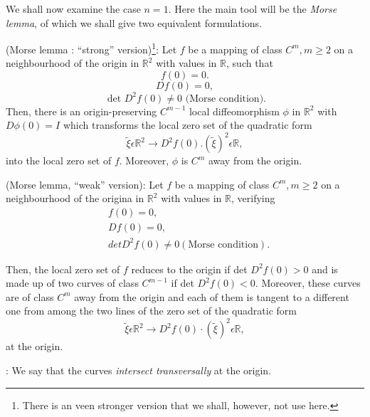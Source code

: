 We shall now examine the case $n = 1$. Here the main tool will be the {\em Morse lemma}, of which we shall give two equivalent formulations.

\begin{theorem}\label{chap1-thm3.1}
(Morse lemma : ``strong'' version)\footnote{There is an veen stronger version that we shall, however, not use here.}: Let $f$ be a mapping of class $C^{m}, m \geq 2$ on a neighbourhood of the origin in $\mathbb{R}^{2}$ with values in $\mathbb{R}$, such that
$$
f(0) = 0.
$$
$$
Df(0) = 0,
$$\pageoriginale
$$
\text{ det } D^{2}f(0) \neq 0 \text{ (Morse condition).}
$$
Then, there is an origin-preserving $C^{m-1}$ local diffeomorphism $\phi$ in $\mathbb{R}^{2}$ with $D\phi(0) = I$ which transforms the local zero set of the quadratic form
$$
\widetilde{\xi} \epsilon \mathbb{R}^{2} \to D^{2} f (0). (\widetilde{\xi})^{2} \epsilon \mathbb{R}, 
$$
into the local zero set of $f$. Moreover, $\phi$ is $C^{m}$ away from the origin.
\end{theorem}

\begin{theorem*}[3.1']\label{chap1-thm3.1'}
(Morse lemma, ``weak'' version): Let $f$ be a mapping of class $C^{m}, m \geq 2$ on a neighbourhood of the origina in $\mathbb{R}^{2}$ with values in $\mathbb{R}$, verifying
\begin{align*}
& f(0) = 0,\\
& Df(0) = 0,\\
& det D^{2}f(0) \neq 0 (\text{Morse condition}).
\end{align*}

Then, the local zero set of $f$ reduces to the origin if det $D^{2}f(0) > 0$ and is made up of two curves of class $C^{m-1}$ if det $D^{2}f(0) < 0$. Moreover, these curves are of class $C^{m}$ away from the origin and each of them is tangent to a different one from among the two lines of the zero set of the quadratic form
$$
\widetilde{\xi} \epsilon \mathbb{R}^{2} \to D^{2}f(0) \cdot (\widetilde{\xi})^{2} \epsilon \mathbb{R},
$$
at the origin.
\end{theorem*}

\medskip
{}\pageoriginale : We say that the curves {\em intersect transversally} at the origin.

